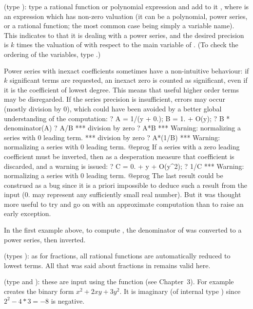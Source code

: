 \label{se:series}
(type ): type a rational function or polynomial expression and add
to it \hbox{}, where  is an expression
which has non-zero valuation (it can be a polynomial, power series, or a
rational function; the most common case being simply a variable name). This
indicates to  that it is dealing with a power series, and the desired
precision is $k$ times the valuation of  with respect to the main
variable of . (To check the ordering of the variables, type
.)

 Power series with inexact coefficients sometimes have a
non-intuitive behaviour: if $k$ significant terms are requested, an inexact
zero is counted as significant, even if it is the coefficient of lowest
degree. This means that useful higher order terms may be disregarded.
If the series precision is insufficient, errors may occur (mostly division by
$0$), which could have been avoided by a better global understanding of the
computation:
\bprog
    ? A = 1/(y + 0.); B = 1. + O(y);
    ? B * denominator(A)
    ? A/B
    ***   division by zero
    ? A*B
    ***   Warning: normalizing a series with 0 leading term.
    ***   division by zero
    ? A*(1/B)
    ***   Warning: normalizing a series with 0 leading term.
@eprog\noindent
If a series with a zero leading coefficient must be inverted, then as a
desperation measure that coefficient is discarded, and a warning is issued:
\bprog
    ? C = 0. + y + O(y^2);
    ? 1/C
    ***   Warning: normalizing a series with 0 leading term.
@eprog\noindent
The last result could be construed as a bug since it is a priori impossible
to deduce such a result from the input ($0.$ may represent any sufficiently
small real number). But it was thought more useful to try and go on with an
approximate computation than to raise an early exception.

In the first example above, to compute , the denominator of
 was converted to a power series, then inverted.

(types ): as for fractions, all rational
functions are automatically reduced to lowest terms. All that was
said about fractions in  remains valid here.

%
(type  and ):
these are input using the function  (see Chapter~3). For example
 creates the binary form $x^2+2xy+3y^2$. It is imaginary (of
internal type ) since $2^2 - 4*3 = -8$ is negative.

